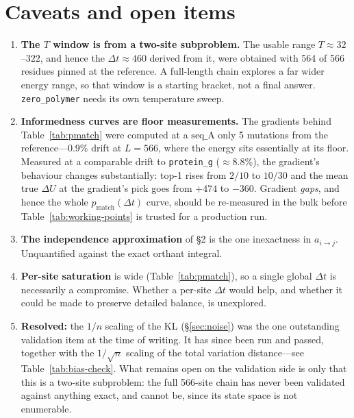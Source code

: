 \documentclass[11pt,a4paper]{article}
\newcommand{\dt}{\Delta t}
\newcommand{\pmatch}{p_{\mathrm{match}}}
\begin{document}
\section{Caveats and open items}

\begin{enumerate}
  \item \textbf{The $T$ window is from a two-site subproblem.} The usable
        range $T \approx 32$--$322$, and hence the $\dt \approx 460$ derived
        from it, were obtained with 564 of 566 residues pinned at the
        reference. A full-length chain explores a far wider energy range, so
        that window is a starting bracket, not a final answer.
        \texttt{zero\_polymer} needs its own temperature sweep.
  \item \textbf{Informedness curves are floor measurements.} The gradients
        behind Table~\ref{tab:pmatch} were computed at a $\mathrm{seq\_A}$
        only 5 mutations from the reference---$0.9\%$ drift at $L=566$, where
        the energy sits essentially at its floor. Measured at a comparable
        drift to \texttt{protein\_g} ($\approx\!8.8\%$), the gradient's
        behaviour changes substantially: top-1 rises from $2/10$ to $10/30$
        and the mean true $\Delta U$ at the gradient's pick goes from $+474$
        to $-360$. Gradient \emph{gaps}, and hence the whole $\pmatch(\dt)$
        curve, should be re-measured in the bulk before
        Table~\ref{tab:working-points} is trusted for a production run.
  \item \textbf{The independence approximation} of \S2 is the one inexactness
        in $a_{i\to j}$. Unquantified against the exact orthant integral.
  \item \textbf{Per-site saturation} is wide (Table~\ref{tab:pmatch}), so a
        single global $\dt$ is necessarily a compromise. Whether a per-site
        $\dt$ would help, and whether it could be made to preserve detailed
        balance, is unexplored.
  \item \textbf{Resolved:} the $1/n$ scaling of the KL (\S\ref{sec:noise})
        was the one outstanding validation item at the time of writing. It has
        since been run and passed, together with the $1/\sqrt{n}$ scaling of
        the total variation distance---see Table~\ref{tab:bias-check}. What
        remains open on the validation side is only that this is a two-site
        subproblem: the full 566-site chain has never been validated against
        anything exact, and cannot be, since its state space is not
        enumerable.
\end{enumerate}
\end{document}
